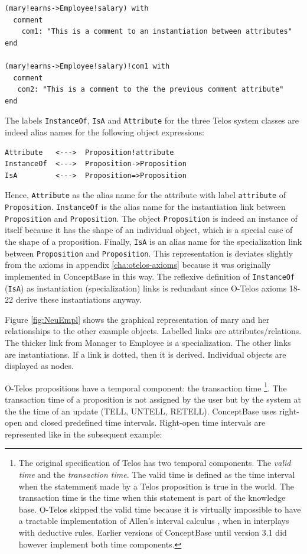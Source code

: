 \begin{verbatim}
(mary!earns->Employee!salary) with
  comment
    com1: "This is a comment to an instantiation between attributes"
end

(mary!earns->Employee!salary)!com1 with
  comment
   com2: "This is a comment to the the previous comment attribute"
end

\end{verbatim}


The labels {\tt InstanceOf}, {\tt IsA} and {\tt Attribute} for the three Telos system
classes are indeed alias names for the following object expressions:

\begin{verbatim}
Attribute   <--->  Proposition!attribute
InstanceOf  <--->  Proposition->Proposition
IsA         <--->  Proposition=>Proposition
\end{verbatim}

Hence, {\tt Attribute} as the alias name for the attribute with label {\tt attribute} of
{\tt Proposition}. {\tt InstanceOf} is the alias name for the instantiation link between
{\tt Proposition} and {\tt Proposition}. The object {\tt Proposition} is indeed an instance
of itself because it has the shape of an individual object, which is a special case of
the shape of a proposition. Finally, {\tt IsA} is an alias name for the specialization link
between {\tt Proposition} and {\tt Proposition}. This representation is deviates
slightly from the axioms in appendix \ref{cha:otelos-axioms} because it was originally
implemented in ConceptBase in this way. The reflexive definition of {\tt InstanceOf}
({\tt IsA}) as instantiation (specialization) links is redundant since O-Telos axioms 18-22
derive these instantiations anyway.


Figure \ref{fig:NeuEmpl} shows the graphical
representation of mary and her relationships to the other example
objects. Labelled links are attributes/relations. The thicker link
from Manager to Employee is a specialization. The other links are
instantiations. If a link is dotted, then it is derived.
Individual objects are displayed as nodes. 



O-Telos propositions have a temporal component: the transaction time%
\footnote{The original specification of Telos has two temporal components. The
{\em valid time\/} and the {\em transaction time}. The valid time is defined as
the time interval when the statemment made by a Telos proposition is true in the world.
The transaction time is the time when this statement is part of the knowledge base.
O-Telos skipped the valid time because it is virtually impossible to have a
tractable implementation of Allen's interval calculus \cite{All83},
when in interplays with deductive rules. Earlier versions
of ConceptBase until version 3.1 did however implement both time components.}.
The transaction time of a proposition is not assigned by the user but by the system at
the the time of an update (TELL, UNTELL, RETELL). ConceptBase uses right-open
and closed predefined time intervals. Right-open time intervals are represented like
in the subsequent example: 

